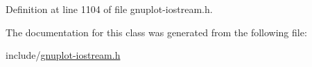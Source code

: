 Definition at line 1104 of file gnuplot-\/iostream.\+h.



The documentation for this class was generated from the following file\+:\begin{DoxyCompactItemize}
\item 
include/\hyperlink{gnuplot-iostream_8h}{gnuplot-\/iostream.\+h}\end{DoxyCompactItemize}
